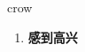 
\begin{frame}
{\huge crow}
\begin{center}
\begin{enumerate}\Large
  \item \textbf{感到高兴}
\end{enumerate}
\end{center}
\end{frame}
